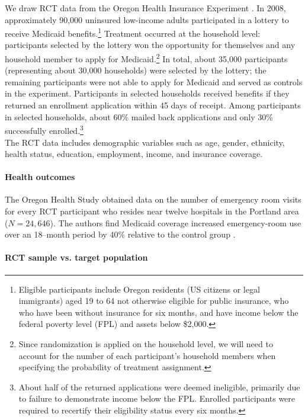 \documentclass{article}
\begin{document}
We draw RCT data from the Oregon Health Insurance Experiment \cite{finkelstein2012,Taubman}.  In 2008, approximately 90,000 uninsured low-income adults participated in a lottery to receive Medicaid benefits.\footnote{Eligible participants include Oregon residents (US citizens or legal immigrants) aged 19 to 64 not otherwise eligible for public insurance, who who have been without insurance for six months, and have income below the federal poverty level (FPL) and assets below \$2,000.} Treatment occurred at the household level: participants selected by the lottery won the opportunity for themselves and any household member to apply for Medicaid.\footnote{Since randomization is applied on the household level, we will need to account for the number of each participant's household members when specifying the probability of treatment assignment.} In total, about 35,000 participants (representing about 30,000 households) were selected by the lottery; the remaining participants were not able to apply for Medicaid and served as controls in the experiment.  Participants in selected households received benefits if they returned an enrollment application within 45 days of receipt. Among participants in selected households, about 60\% mailed back applications and only 30\% successfully enrolled.\footnote{About half of the returned applications were deemed ineligible, primarily due to failure to demonstrate income below the FPL. Enrolled participants were required to recertify their eligibility status every six months.} \\

The RCT data includes demographic variables such as age, gender, ethnicity, health status, education, employment, income, and insurance coverage. 

\paragraph{Health outcomes} 

The Oregon Health Study obtained data on the number of emergency room visits for every RCT participant who resides near twelve hospitals in the Portland area ($N=24,646$). The authors find Medicaid coverage increased emergency-room use over an 18--month period by 40\% relative to the control group \cite{Taubman}. 
 
\paragraph{RCT sample vs. target population}
\end{document}
